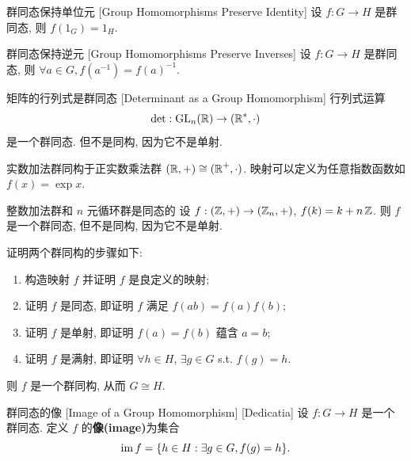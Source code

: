         \begin{ppt}
            {群同态保持单位元}
            [Group Homomorphisms Preserve Identity]
            设 \(f:G\to H\) 是群同态, 则 \(f(1_G)=1_H\).
        \end{ppt}

        \begin{ppt}
            {群同态保持逆元}
            [Group Homomorphisms Preserve Inverses]
            设 \(f:G\to H\) 是群同态, 则 \(\forall a\in G, f(a^{-1})=f(a)^{-1}\).
        \end{ppt}

        \begin{ins}
            {矩阵的行列式是群同态}
            [Determinant as a Group Homomorphism]
            行列式运算
            \[\det : \operatorname{GL}_n(\operatorname{\mathbb{R}}) \to (\operatorname{\mathbb{R}}^*, \cdot)\]
            是一个群同态. 但不是同构, 因为它不是单射.
        \end{ins}

        \begin{ins}
            {实数加法群同构于正实数乘法群}
            \((\operatorname{\mathbb{R}},+)\cong (\operatorname{\mathbb{R}}^+, \cdot)\).
            映射可以定义为任意指数函数如 \(f(x)=\exp x\).
        \end{ins}

        \begin{ins}
            {整数加法群和 \(n\) 元循环群是同态的}
            设 \(f: (\operatorname{\mathbb{Z}},+)\to (\operatorname{\mathbb{Z}}_n, +)\), \(f(k)=k+n\operatorname{\mathbb{Z}}\). 则 \(f\) 是一个群同态, 但不是同构, 因为它不是单射.
        \end{ins}

        \begin{rmk}
            [Dedicatia]
            证明两个群同构的步骤如下:
            \begin{enumerate}[label=(\arabic*)]
                \item 构造映射 \(f\) 并证明 \(f\) 是良定义的映射;
                \item 证明 \(f\) 是同态, 即证明 \(f\) 满足 \(f(ab)=f(a)f(b)\);
                \item 证明 \(f\) 是单射, 即证明 \(f(a)=f(b)\) 蕴含 \(a=b\);
                \item 证明 \(f\) 是满射, 即证明 \(\forall h\in H\), \(\exists g\in G\) s.t. \(f(g)=h\).
            \end{enumerate}
            则 \(f\) 是一个群同构, 从而 \(G\cong H\).
        \end{rmk}

        \begin{dfn}
            {群同态的像}
            [Image of a Group Homomorphism]
            [Dedicatia]
            设 \(f:G\to H\) 是一个群同态. 定义 \(f\) 的\textbf{像(image)}为集合
            \[\operatorname{im} f=\{h\in H: \exists g\in G, f(g)=h\}.\]
        \end{dfn}

